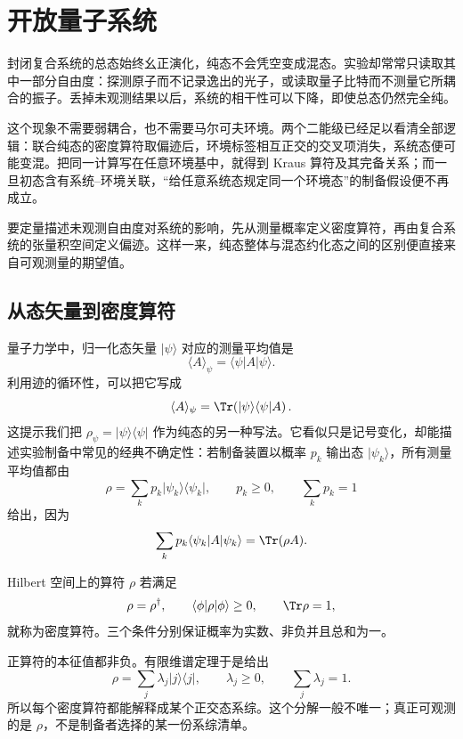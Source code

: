 \chapter{开放量子系统}
\label{chap:phys-oqs-open-quantum-systems}

封闭复合系统的总态始终幺正演化，纯态不会凭空变成混态。实验却常常只读取其中一部分自由度：探测原子而不记录逸出的光子，或读取量子比特而不测量它所耦合的振子。丢掉未观测结果以后，系统的相干性可以下降，即使总态仍然完全纯。

这个现象不需要弱耦合，也不需要马尔可夫环境。两个二能级已经足以看清全部逻辑：联合纯态的密度算符取偏迹后，环境标签相互正交的交叉项消失，系统态便可能变混。把同一计算写在任意环境基中，就得到 Kraus 算符及其完备关系；而一旦初态含有系统--环境关联，“给任意系统态规定同一个环境态”的制备假设便不再成立。

要定量描述未观测自由度对系统的影响，先从测量概率定义密度算符，再由复合系统的张量积空间定义偏迹。这样一来，纯态整体与混态约化态之间的区别便直接来自可观测量的期望值。

\section{从态矢量到密度算符}

量子力学中，归一化态矢量 \(\lvert\psi\rangle\) 对应的测量平均值是
\[
\langle A\rangle_\psi
=\langle\psi\rvert A\lvert\psi\rangle.
\]
利用迹的循环性，可以把它写成
\[
\langle A\rangle_\psi
=\Tr\!\left(\lvert\psi\rangle\langle\psi\rvert A\right).
\]
这提示我们把
\(\rho_\psi=\lvert\psi\rangle\langle\psi\rvert\)
作为纯态的另一种写法。它看似只是记号变化，却能描述实验制备中常见的经典不确定性：若制备装置以概率 \(p_k\) 输出态
\(\lvert\psi_k\rangle\)，所有测量平均值都由
\begin{equation}
\rho=\sum_k p_k\lvert\psi_k\rangle\langle\psi_k\rvert,
\qquad p_k\geq0,\qquad \sum_k p_k=1
\label{eq:oqs-density-mixture}
\end{equation}
给出，因为
\[
\sum_kp_k\langle\psi_k\rvert A\lvert\psi_k\rangle
=\Tr(\rho A).
\]

\begin{definition}[密度算符]
Hilbert 空间上的算符 \(\rho\) 若满足
\[
\rho=\rho^\dagger,
\qquad \langle\phi\rvert\rho\lvert\phi\rangle\geq0,
\qquad \Tr\rho=1,
\]
就称为密度算符。三个条件分别保证概率为实数、非负并且总和为一。
\end{definition}

正算符的本征值都非负。有限维谱定理于是给出
\[
\rho=\sum_j\lambda_j\lvert j\rangle\langle j\rvert,
\qquad \lambda_j\geq0,\qquad \sum_j\lambda_j=1.
\]
所以每个密度算符都能解释成某个正交态系综。这个分解一般不唯一；真正可观测的是 \(\rho\)，不是制备者选择的某一份系综清单。


